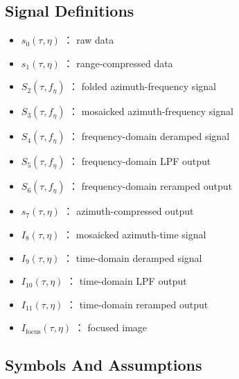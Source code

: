 \documentclass[11pt]{article}
\providecommand{\tightlist}{%
  \setlength{\itemsep}{0pt}\setlength{\parskip}{0pt}}
\begin{document}
\hypertarget{signal-definitions}{%
\subsection{Signal Definitions}\label{signal-definitions}}

\begin{itemize}
\tightlist
\item
  \(s_0(\tau,\eta)\) ： raw data
\item
  \(s_1(\tau,\eta)\) ： range-compressed data
\item
  \(S_2(\tau,f_\eta)\) ： folded azimuth-frequency signal
\item
  \(S_3(\tau,f_\eta)\) ： mosaicked azimuth-frequency signal
\item
  \(S_4(\tau,f_\eta)\) ： frequency-domain deramped signal
\item
  \(S_5(\tau,f_\eta)\) ： frequency-domain LPF output
\item
  \(S_6(\tau,f_\eta)\) ： frequency-domain reramped output
\item
  \(s_7(\tau,\eta)\) ： azimuth-compressed output
\item
  \(I_8(\tau,\eta)\) ： mosaicked azimuth-time signal
\item
  \(I_9(\tau,\eta)\) ： time-domain deramped signal
\item
  \(I_{10}(\tau,\eta)\) ： time-domain LPF output
\item
  \(I_{11}(\tau,\eta)\) ： time-domain reramped output
\item
  \(I_{\mathrm{focus}}(\tau,\eta)\) ： focused image
\end{itemize}

\hypertarget{symbols-and-assumptions}{%
\subsection{Symbols And Assumptions}\label{symbols-and-assumptions}}
\end{document}
